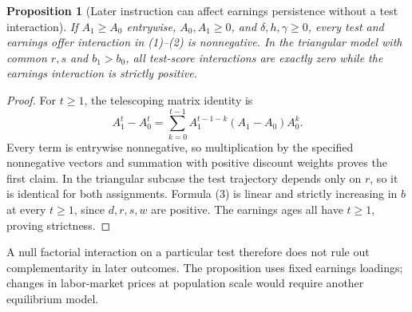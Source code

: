 \documentclass[11pt,a4paper]{article}
\newtheorem{proposition}[theorem]{Proposition}
\theoremstyle{remark}
\begin{document}
\begin{proposition}[Later instruction can affect earnings persistence without a test interaction]
If $A_1\ge A_0$ entrywise, $A_0,A_1\ge0$, and $\delta,h,\gamma\ge0$, every test and earnings offer interaction in (1)--(2) is nonnegative. In the triangular model with common $r,s$ and $b_1>b_0$, all test-score interactions are exactly zero while the earnings interaction is strictly positive.
\end{proposition}
\begin{proof}
For $t\ge1$, the telescoping matrix identity is
\[
 A_1^t-A_0^t=\sum_{k=0}^{t-1}
 A_1^{t-1-k}(A_1-A_0)A_0^k.
\]
Every term is entrywise nonnegative, so multiplication by the specified nonnegative vectors and summation with positive discount weights proves the first claim. In the triangular subcase the test trajectory depends only on $r$, so it is identical for both assignments. Formula (3) is linear and strictly increasing in $b$ at every $t\ge1$, since $d,r,s,w$ are positive. The earnings ages all have $t\ge1$, proving strictness.
\end{proof}
A null factorial interaction on a particular test therefore does not rule out complementarity in later outcomes. The proposition uses fixed earnings loadings; changes in labor-market prices at population scale would require another equilibrium model.
\end{document}
